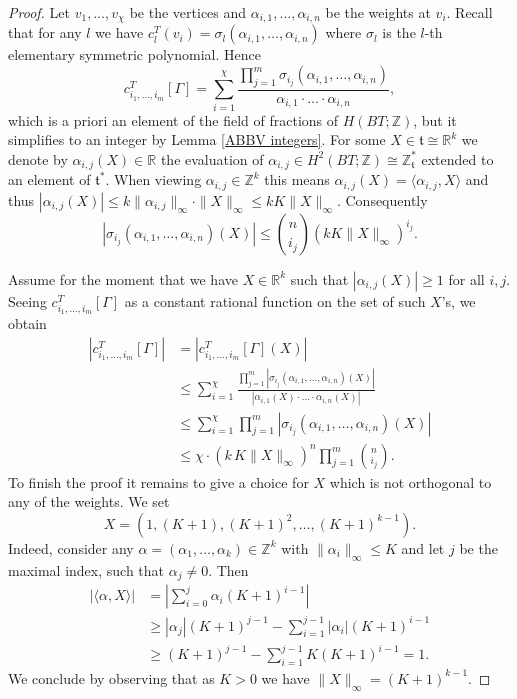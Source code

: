 \documentclass[10pt,a4paper]{amsart}
\newcommand{\RR}{\mathbb{R}}
\newcommand{\ZZ}{\mathbb{Z}}
\newcommand{\mft}{\mathfrak{t}}
\begin{document}
\begin{proof}
Let $v_1,\ldots, v_\chi$ be the vertices and $\alpha_{i,1},\ldots,\alpha_{i,n}$ be the weights at $v_i$. Recall that for any $l$ we have $c_l^T(v_i)=\sigma_{l}(\alpha_{i,1},\ldots,\alpha_{i,n})$ where $\sigma_l$ is the $l$-th elementary symmetric polynomial. Hence
\[c^T_{i_1,\ldots,i_m}[\Gamma] = \sum_{i=1}^{\chi} \frac{\prod_{j=1}^m \sigma_{i_j}(\alpha_{i,1},\ldots,\alpha_{i,n})}{\alpha_{i,1}\cdot\ldots\cdot\alpha_{i,n}},\]
which is a priori an element of the field of fractions of $H(BT;\ZZ)$, but it simplifies to an integer by Lemma \ref{ABBV integers}. For some $X\in \mathfrak{t}\cong \RR^k$ we denote by $\alpha_{i,j}(X)\in \RR$ the evaluation of $\alpha_{i,j}\in H^2(BT;\ZZ)\cong \ZZ_\mft^*$ extended to an element of $\mft^*$. When viewing $\alpha_{i,j}\in \ZZ^k$ this means $\alpha_{i,j}(X)=\langle \alpha_{i,j},X\rangle$ and thus $|\alpha_{i,j}(X)|\leq k \|\alpha_{i,j}\|_\infty \cdot \|X\|_\infty\leq kK\|X\|_\infty$. Consequently
\[|\sigma_{i_j}(\alpha_{i,1},\ldots,\alpha_{i,n})(X)|\leq {n \choose i_j}(kK\|X\|_\infty)^{i_j}.
\]

Assume for the moment that we have $X\in \RR^k$ such that $|\alpha_{i,j}(X)|\geq 1$ for all $i,j$. Seeing $c^T_{i_1,\ldots,i_m}[\Gamma]$ as a constant rational function on the set of such $X$'s, we obtain
\begin{align*}
|c^T_{i_1,\ldots,i_m}[\Gamma]| &= \left|c^T_{i_1,\ldots,i_m}[\Gamma] (X)\right|\\
&\leq \sum_{i=1}^\chi \frac{\prod_{j=1}^m |\sigma_{i_j}(\alpha_{i,1},\ldots,\alpha_{i,n})(X)|}{|\alpha_{i,1}(X)\cdot\ldots\cdot\alpha_{i,n}(X)|}\\
&\leq \sum_{i=1}^\chi \prod_{j=1}^m |\sigma_{i_j}(\alpha_{i,1},\ldots,\alpha_{i,n})(X)|\\
&\leq \chi\cdot (k\,K\|X\|_\infty)^n\prod_{j=1}^m {n\choose i_j}.
\end{align*}
To finish the proof it remains to give a choice for $X$ which is not orthogonal to any of the weights. We set
\[X= (1,(K+1),(K+1)^2,\ldots, (K+1)^{k-1}).\]
Indeed, consider any $\alpha =(\alpha_1,\ldots,\alpha_k)\in \ZZ^k$ with $\|\alpha_i\|_{\infty}\leq K$ and let $j$ be the maximal index, such that $\alpha_j\neq 0$. Then
\begin{align*}
|\langle\alpha,X\rangle| &=\left|\sum_{i=0}^j \alpha_i (K+1)^{i-1}\right|\\ &\geq |\alpha_j| (K+1)^{j-1}-\sum_{i=1}^{j-1} |\alpha_i|(K+1)^{i-1}\\ &\geq (K+1)^{j-1} - \sum^{j-1}_{i=1} K(K+1)^{i-1} =1.
\end{align*}
We conclude by observing that as $K> 0$ we have $\|X\|_\infty = (K+1)^{k-1}$.
\end{proof}
\end{document}
